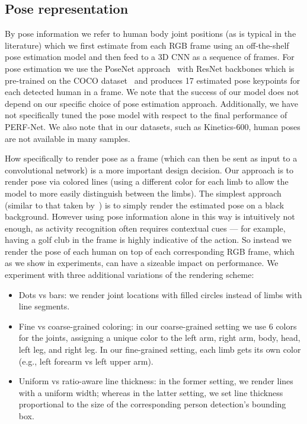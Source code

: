 \documentclass[10pt,twocolumn,letterpaper]{article}
\begin{document}
\subsection{Pose representation}
\label{sec:data_rendering}



By pose information we refer to human body joint positions (as is typical in the literature) which we first estimate from each RGB frame using an off-the-shelf pose estimation model and then feed to a 3D CNN as a sequence of frames. For pose estimation we use the PoseNet approach~\cite{posenet2015,posenet_inwild} with ResNet backbones which is pre-trained on the COCO dataset~\cite{lin2014microsoft} and produces 17 estimated pose keypoints for each detected human in a frame.  We note that the success of our model does not depend on our specific choice of pose estimation approach. Additionally, we have not specifically tuned the pose model with respect to the final performance of PERF-Net. We also note that in our datasets, such as Kinetics-600, human poses are not available in many samples.

How specifically to render pose as a frame (which can then be sent as input to a convolutional network) is a more important design decision.  Our approach is to render pose via colored lines (using a different color for each limb to allow the model to more easily distinguish between the limbs). The simplest approach (similar to that taken by~\cite{zolfaghari2017chained}) is to simply render the estimated pose on a black background.  However using pose information
alone in this way is intuitively not enough, as activity recognition often  requires  contextual  cues --- for example, having a golf club in the frame is highly indicative of the action. So instead we render the pose of each human on top of each corresponding RGB frame, which as we show in experiments, can have a sizeable impact on performance. We experiment with three additional variations of the rendering scheme:
\begin{itemize}
\item Dots vs bars: we render joint locations with filled circles instead of limbs with line segments.
    \item Fine vs coarse-grained coloring: in our coarse-grained setting we use 6 colors for the joints, assigning a unique color to the left arm, right arm, body, head, left leg, and right leg.  In our fine-grained setting, each limb gets its own color (e.g., left forearm vs left upper arm).
\item Uniform vs ratio-aware line thickness: in the former setting, we render lines with a uniform width; whereas in the latter setting,
we set line thickness proportional to the size of the corresponding
person detection's bounding box.
\end{itemize}
\end{document}
